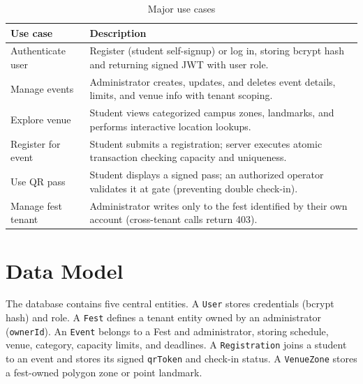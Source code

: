 \documentclass[11pt,a4paper]{report}
\begin{document}
\begin{table}[ht]
\centering
\caption{Major use cases}
\label{tab:usecases}
\begin{tabular}{p{3.1cm}p{9.5cm}}
\toprule
\textbf{Use case} & \textbf{Description}\\
\midrule
Authenticate user & Register (student self-signup) or log in, storing bcrypt hash and returning signed JWT with user role.\\
Manage events & Administrator creates, updates, and deletes event details, limits, and venue info with tenant scoping.\\
Explore venue & Student views categorized campus zones, landmarks, and performs interactive location lookups.\\
Register for event & Student submits a registration; server executes atomic transaction checking capacity and uniqueness.\\
Use QR pass & Student displays a signed pass; an authorized operator validates it at gate (preventing double check-in).\\
Manage fest tenant & Administrator writes only to the fest identified by their own account (cross-tenant calls return 403).\\
\bottomrule
\end{tabular}
\end{table}

\section{Data Model}
The database contains five central entities. A \texttt{User} stores credentials (bcrypt hash) and role. A \texttt{Fest} defines a tenant entity owned by an administrator (\texttt{ownerId}). An \texttt{Event} belongs to a Fest and administrator, storing schedule, venue, category, capacity limits, and deadlines. A \texttt{Registration} joins a student to an event and stores its signed \texttt{qrToken} and check-in status. A \texttt{VenueZone} stores a fest-owned polygon zone or point landmark.
\end{document}
